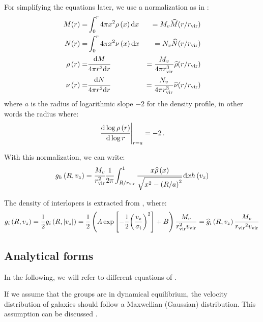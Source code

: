 For simplifying the equations later, we use a normalization as in
:
%
\begin{eqnarray}
    M(r)= &\int_0^r 4\pi x^2\rho \left(x\right){\rm{d}} x
        &=M_v{\widehat{M}{(r/r_{\rm vir})}}\nonumber\\
    N(r)= &\int_0^r 4\pi x^2\nu \left(x\right){\rm{d}} x
        &=N_v{\widehat{N}{(r/r_{\rm vir})}}\nonumber\\
    \rho\left(r\right)= &\cfrac{{\rm{d}} M}{4\pi r^2{\rm{d}} r}&=\frac{M_v}{4\pi r_{\rm vir}^3}
        \widehat\rho(r/r_{\rm vir})\nonumber\\
    \nu\left(r\right)= &\cfrac{{\rm{d}} N}{4\pi r^2{\rm{d}} r}&=
        \frac{N_v}{4\pi r_{\rm vir}^3}\widehat\nu (r/r_{\rm vir})
\end{eqnarray}
%
where $a$ is the radius of logarithmic slope $-2$ for the density profile, in
other words the radius where:
%
\begin{equation}
    {\left.\cfrac{{\rm{d}}\log \rho \left(r\right)}{{\rm{d}}\log r}\right|}_{r=a} =
    -2\,.
\end{equation}

With this normalization, we can write:
%
\begin{equation}
    g_h \left(R, v_z\right) =\cfrac{M_v}{r_{\rm vir}^2}
    \cfrac{1}{2\pi}
    \int_{R/r_{\rm vir}}^1
    \cfrac{x\widehat\rho \left(x\right)}{\sqrt{x^2 -
    {\left(R/a\right)}^2}}\,{\rm{d}} x h \left(v_z\right)
\end{equation}

The density of interlopers is extracted from \citet{MBM+10}, where:
%
\begin{equation}
    g_i\left(R,v_z\right)=\frac{1}{2} g_i\left(R,|v_z|\right)=
    \frac{1}{2}\left(A
        \exp\left[-\frac{1}{2}{\left(\frac{v_z}{\sigma_i}\right)}^2\right]
    +B\right)\frac{M_v}{r_{\rm vir}^2 v_{\rm vir}}=
    \widehat g_i\left(R,v_z\right)\frac{M_v}{{r_{\rm{vir}}}^2 v_{\rm{vir}}}
\end{equation}

\subsection{Analytical forms}
\label{sub:analytical_forms}

In the following, we will refer to different equations of
.

If we assume that the groups are in dynamical equilibrium, the velocity
distribution of galaxies should follow a Maxwellian (Gaussian) distribution.
This assumption can be discussed \citep{Beraldo+14}.

